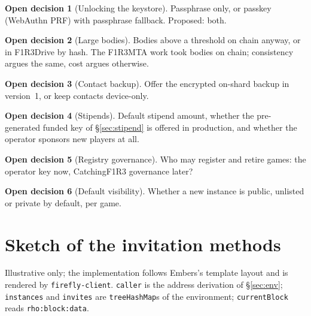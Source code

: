 \documentclass[11pt]{article}
\theoremstyle{definition}
\newtheorem{decision}{Open decision}
\theoremstyle{remark}
\newcommand{\code}[1]{\texttt{#1}}
\newcommand{\Em}{Embers}
\begin{document}
\begin{decision}[Unlocking the keystore]\label{dec:unlock}
Passphrase only, or passkey (WebAuthn PRF) with passphrase fallback. Proposed: both.
\end{decision}

\begin{decision}[Large bodies]\label{dec:bodies}
Bodies above a threshold on chain anyway, or in F1R3Drive by hash. The F1R3MTA work
took bodies on chain; consistency argues the same, cost argues otherwise.
\end{decision}

\begin{decision}[Contact backup]\label{dec:backup}
Offer the encrypted on-shard backup in version~1, or keep contacts device-only.
\end{decision}

\begin{decision}[Stipends]\label{dec:stipend}
Default stipend amount, whether the pre-generated funded key of
\S\ref{sec:stipend} is offered in production, and whether the operator sponsors new
players at all.
\end{decision}

\begin{decision}[Registry governance]
Who may register and retire games: the operator key now, CatchingF1R3 governance
later?
\end{decision}

\begin{decision}[Default visibility]
Whether a new instance is public, unlisted or private by default, per game.
\end{decision}

\appendix
\section{Sketch of the invitation methods}\label{app:rho}

Illustrative only; the implementation follows \Em{}'s template layout and is
rendered by \code{firefly-client}. \code{caller} is the address derivation of
\S\ref{sec:env}; \code{instances} and \code{invites} are \code{treeHashMap}s of the
environment; \code{currentBlock} reads \code{rho:block:data}.
\end{document}
